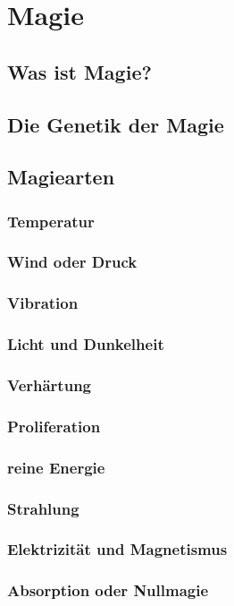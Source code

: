 \section{Magie}
\subsection{Was ist Magie?}
\subsection{Die Genetik der Magie}
\subsection{Magiearten}
\subsubsection{Temperatur}
\subsubsection{Wind oder Druck}
\subsubsection{Vibration}
\subsubsection{Licht und Dunkelheit}
\subsubsection{Verhärtung}
\subsubsection{Proliferation}
\subsubsection{reine Energie}
\subsubsection{Strahlung}
\subsubsection{Elektrizität und Magnetismus}
\subsubsection{Absorption oder Nullmagie}

